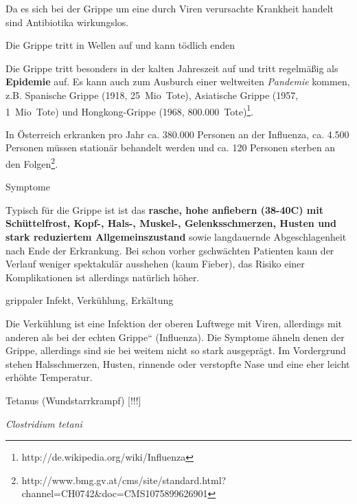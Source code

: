\documentclass{article}
\newcommand\gEs[1]{\textbf{\textcolor[rgb]{0.0,0.0,0.5019608}{#1}}}
\newcommand\gEs[1]{\textbf{\textcolor[rgb]{0.0,0.0,0.5019608}{#1}}}
\newcommand\gE[1]{\textit{#1}}
\newcommand\gZ[1]{\textcolor[rgb]{0.5019608,0.5019608,0.5019608}{#1}}
\begin{document}
{\mdseries
Da es sich bei der Grippe um eine durch Viren verursachte Krankheit
handelt sind Antibiotika wirkungslos.}

{\mdseries\color{black}
Die Grippe tritt in Wellen auf und kann t\"odlich enden}

{\mdseries
Die Grippe tritt besonders in der kalten Jahreszeit auf und tritt
regelm\"a{\ss}ig als \gEs{Epidemie}
auf. Es kann auch zum Ausburch einer weltweiten
\gE{Pandemie} kommen,
\gZ{z.B. Spanische Grippe (1918, 25~Mio~Tote),
Asiatische Grippe (1957, 1~Mio~Tote) und  Hongkong-Grippe (1968,
800.000~Tote)}\footnote{http://de.wikipedia.org/wiki/Influenza}\gZ{.
}}

{\mdseries
In \"Osterreich erkranken pro Jahr ca. 380.000 Personen an der
Influenza, ca. 4.500 Personen m\"ussen station\"ar behandelt werden und
ca. 120 Personen sterben an den
Folgen\footnote{http://www.bmg.gv.at/cms/site/standard.html?channel=CH0742\&doc=CMS1075899626901}.}

{\mdseries\color{black}
Symptome}

{\mdseries
Typisch f\"ur die Grippe ist ist das \gEs{rasche,
hohe anfiebern (38{\textdegree}-40{\textdegree}C) mit Sch\"uttelfrost, 
Kopf-, Hals-, Muskel-, Gelenksschmerzen, Husten und stark reduziertem
Allgemeinszustand} sowie langdauernde Abgeschlagenheit nach Ende der
Erkrankung. Bei schon vorher gschw\"achten Patienten kann der Verlauf
weniger spektakul\"ar ausshehen (kaum Fieber), das Risiko einer
Komplikationen ist allerdings nat\"urlich h\"oher. }

{\mdseries\color[rgb]{0.0,0.0,0.5019608}
grippaler Infekt,
Verk\"uhlung, Erk\"altung}

{\mdseries
Die Verk\"uhlung ist eine Infektion der oberen Luftwege mit Viren,
allerdings mit anderen als bei der {\quotedblbase}echten
Grippe{\textquotedblleft} (Influenza). Die Symptome \"ahneln denen der
Grippe, allerdings sind sie bei weitem nicht so stark ausgepr\"agt. Im
Vordergrund stehen Halsschmerzen, Husten, rinnende oder verstopfte Nase
und eine eher leicht erh\"ohte Temperatur. }

{\mdseries\color[rgb]{0.0,0.0,0.5019608}
Tetanus (Wundstarrkrampf) [!!!]}

{\mdseries
\gZ{\textit{Clostridium tetani}}}
\end{document}
